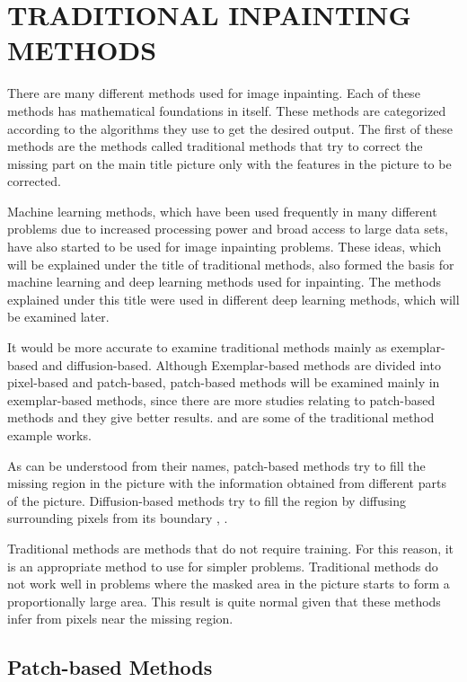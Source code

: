 \chapter{TRADITIONAL INPAINTING METHODS}\label{traditional_methods}

There are many different methods used for image inpainting. Each of these methods has mathematical foundations in itself. These methods are categorized according to the algorithms they use to get the desired output\cite{exemplerinpainting}. The first of these methods are the methods called traditional methods that try to correct the missing part on the main title picture only with the features in the picture to be corrected.

Machine learning methods, which have been used frequently in many different problems due to increased processing power and broad access to large data sets, have also started to be used for image inpainting problems. These ideas, which will be explained under the title of traditional methods, also formed the basis for machine learning and deep learning methods used for inpainting. The methods explained under this title were used in different deep learning methods, which will be examined later.

It would be more accurate to examine traditional methods mainly as exemplar-based and diffusion-based. Although Exemplar-based methods are divided into pixel-based and patch-based, patch-based methods will be examined mainly in exemplar-based methods, since there are more studies relating to patch-based methods and they give better results. \cite{trad1} and \cite{trad2} are some of the traditional method example works.

As can be understood from their names, patch-based methods try to fill the missing region in the picture with the information obtained from different parts of the picture. Diffusion-based methods try to fill the region by diffusing surrounding pixels from its boundary \cite{navier_stokes_inpainting}, \cite{telea}.

Traditional methods are methods that do not require training. For this reason, it is an appropriate method to use for simpler problems. Traditional methods do not work well in problems where the masked area in the picture starts to form a proportionally large area. This result is quite normal given that these methods infer from pixels near the missing region.

\section{Patch-based Methods}

